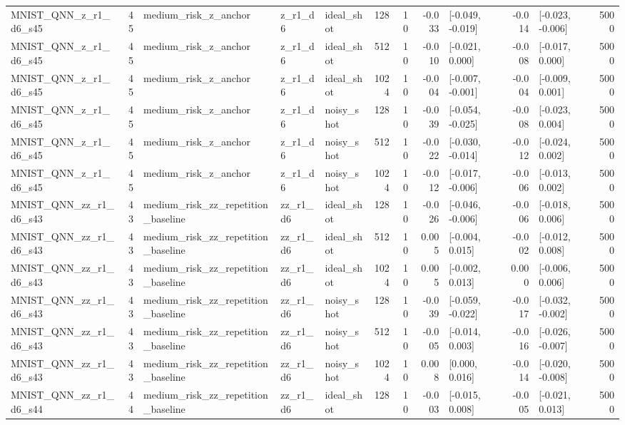 \begin{table}[t]
\begin{tabular}{lrlllrrrlrlr}
MNIST\_QNN\_z\_r1\_d6\_s45 & 45 & medium\_risk\_z\_anchor & z\_r1\_d6 & ideal\_shot & 128 & 10 & -0.033 & [-0.049, -0.019] & -0.014 & [-0.023, -0.006] & 5000 \\
MNIST\_QNN\_z\_r1\_d6\_s45 & 45 & medium\_risk\_z\_anchor & z\_r1\_d6 & ideal\_shot & 512 & 10 & -0.010 & [-0.021, 0.000] & -0.008 & [-0.017, 0.000] & 5000 \\
MNIST\_QNN\_z\_r1\_d6\_s45 & 45 & medium\_risk\_z\_anchor & z\_r1\_d6 & ideal\_shot & 1024 & 10 & -0.004 & [-0.007, -0.001] & -0.004 & [-0.009, 0.001] & 5000 \\
MNIST\_QNN\_z\_r1\_d6\_s45 & 45 & medium\_risk\_z\_anchor & z\_r1\_d6 & noisy\_shot & 128 & 10 & -0.039 & [-0.054, -0.025] & -0.008 & [-0.023, 0.004] & 5000 \\
MNIST\_QNN\_z\_r1\_d6\_s45 & 45 & medium\_risk\_z\_anchor & z\_r1\_d6 & noisy\_shot & 512 & 10 & -0.022 & [-0.030, -0.014] & -0.012 & [-0.024, 0.002] & 5000 \\
MNIST\_QNN\_z\_r1\_d6\_s45 & 45 & medium\_risk\_z\_anchor & z\_r1\_d6 & noisy\_shot & 1024 & 10 & -0.012 & [-0.017, -0.006] & -0.006 & [-0.013, 0.002] & 5000 \\
MNIST\_QNN\_zz\_r1\_d6\_s43 & 43 & medium\_risk\_zz\_repetition\_baseline & zz\_r1\_d6 & ideal\_shot & 128 & 10 & -0.026 & [-0.046, -0.006] & -0.006 & [-0.018, 0.006] & 5000 \\
MNIST\_QNN\_zz\_r1\_d6\_s43 & 43 & medium\_risk\_zz\_repetition\_baseline & zz\_r1\_d6 & ideal\_shot & 512 & 10 & 0.005 & [-0.004, 0.015] & -0.002 & [-0.012, 0.008] & 5000 \\
MNIST\_QNN\_zz\_r1\_d6\_s43 & 43 & medium\_risk\_zz\_repetition\_baseline & zz\_r1\_d6 & ideal\_shot & 1024 & 10 & 0.005 & [-0.002, 0.013] & 0.000 & [-0.006, 0.006] & 5000 \\
MNIST\_QNN\_zz\_r1\_d6\_s43 & 43 & medium\_risk\_zz\_repetition\_baseline & zz\_r1\_d6 & noisy\_shot & 128 & 10 & -0.039 & [-0.059, -0.022] & -0.017 & [-0.032, -0.002] & 5000 \\
MNIST\_QNN\_zz\_r1\_d6\_s43 & 43 & medium\_risk\_zz\_repetition\_baseline & zz\_r1\_d6 & noisy\_shot & 512 & 10 & -0.005 & [-0.014, 0.003] & -0.016 & [-0.026, -0.007] & 5000 \\
MNIST\_QNN\_zz\_r1\_d6\_s43 & 43 & medium\_risk\_zz\_repetition\_baseline & zz\_r1\_d6 & noisy\_shot & 1024 & 10 & 0.008 & [0.000, 0.016] & -0.014 & [-0.020, -0.008] & 5000 \\
MNIST\_QNN\_zz\_r1\_d6\_s44 & 44 & medium\_risk\_zz\_repetition\_baseline & zz\_r1\_d6 & ideal\_shot & 128 & 10 & -0.003 & [-0.015, 0.008] & -0.005 & [-0.021, 0.013] & 5000 \\

\end{tabular}
\end{table}
